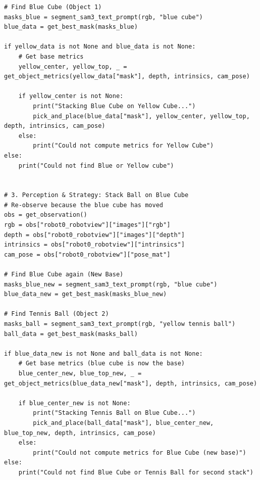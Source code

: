 \begin{lstlisting}
# Find Blue Cube (Object 1)
masks_blue = segment_sam3_text_prompt(rgb, "blue cube")
blue_data = get_best_mask(masks_blue)

if yellow_data is not None and blue_data is not None:
    # Get base metrics
    yellow_center, yellow_top, _ = get_object_metrics(yellow_data["mask"], depth, intrinsics, cam_pose)
    
    if yellow_center is not None:
        print("Stacking Blue Cube on Yellow Cube...")
        pick_and_place(blue_data["mask"], yellow_center, yellow_top, depth, intrinsics, cam_pose)
    else:
        print("Could not compute metrics for Yellow Cube")
else:
    print("Could not find Blue or Yellow cube")


# 3. Perception & Strategy: Stack Ball on Blue Cube
# Re-observe because the blue cube has moved
obs = get_observation()
rgb = obs["robot0_robotview"]["images"]["rgb"]
depth = obs["robot0_robotview"]["images"]["depth"]
intrinsics = obs["robot0_robotview"]["intrinsics"]
cam_pose = obs["robot0_robotview"]["pose_mat"]

# Find Blue Cube again (New Base)
masks_blue_new = segment_sam3_text_prompt(rgb, "blue cube")
blue_data_new = get_best_mask(masks_blue_new)

# Find Tennis Ball (Object 2)
masks_ball = segment_sam3_text_prompt(rgb, "yellow tennis ball")
ball_data = get_best_mask(masks_ball)

if blue_data_new is not None and ball_data is not None:
    # Get base metrics (blue cube is now the base)
    blue_center_new, blue_top_new, _ = get_object_metrics(blue_data_new["mask"], depth, intrinsics, cam_pose)
    
    if blue_center_new is not None:
        print("Stacking Tennis Ball on Blue Cube...")
        pick_and_place(ball_data["mask"], blue_center_new, blue_top_new, depth, intrinsics, cam_pose)
    else:
        print("Could not compute metrics for Blue Cube (new base)")
else:
    print("Could not find Blue Cube or Tennis Ball for second stack")
\end{lstlisting}


